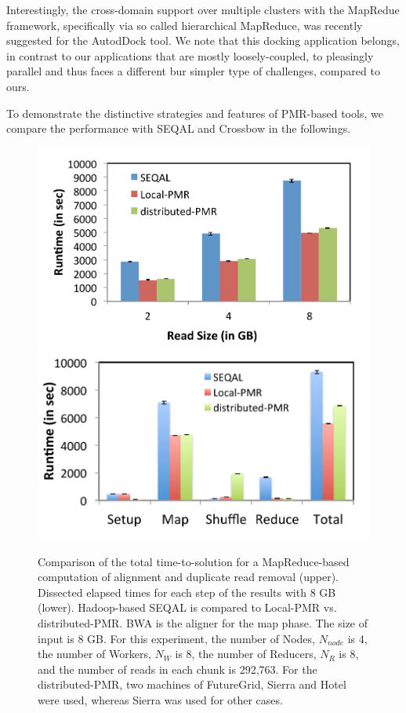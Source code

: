 \documentclass{acm_proc_article-sp}
\begin{document}
Interestingly, the cross-domain support over multiple clusters with the MapRedue framework, specifically via so called hierarchical MapReduce, was recently suggested for the AutodDock tool.  We note that this docking application belongs, in contrast to our applications that are mostly loosely-coupled, to pleasingly parallel and thus faces a different bur simpler type of challenges, compared to ours\cite{ecmls11-mr-autodock}.

To demonstrate the distinctive strategies and features of PMR-based tools, we compare the performance with SEQAL and Crossbow in the followings.  

\begin{figure}
 \centering
\includegraphics[scale=0.50]{figures/seqalvslocalpmr.pdf}
\includegraphics[scale=0.52]{figures/8GB_phasewisetimes.pdf}

\caption{\small Comparison of the total time-to-solution for a MapReduce-based computation of alignment and duplicate read removal (upper).  Dissected elapsed times for each step of the results with 8 GB (lower). Hadoop-based SEQAL is compared to Local-PMR vs. distributed-PMR.  BWA is the aligner for the map phase.  The size of input is 8 GB.  For this experiment, the number of Nodes, $N_{node}$ is 4, the number of Workers, $N_W$ is 8, the number of Reducers, $N_R$ is 8, and the number of reads in each chunk is 292,763. For the distributed-PMR, two machines of FutureGrid, Sierra and Hotel were used, whereas Sierra was used for other cases.}
  \label{fig:comp_with_seqal_1} 
\end{figure}
\end{document}
